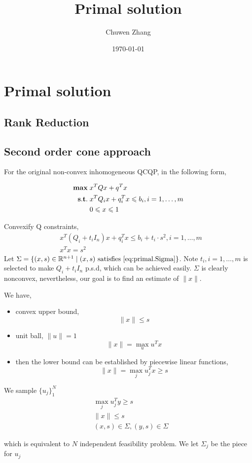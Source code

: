 \documentclass[../main]{subfiles}
\title{Primal solution}
\author{Chuwen Zhang}
\date{\today}
\begin{document}
\maketitle
{
    \setcounter{tocdepth}{3}
    \tableofcontents
}
\section{Primal solution}

\subsection{Rank Reduction}

\subsection{Second order cone approach}
For the original non-convex inhomogeneous QCQP, in the following form,

\begin{align}
    \mathbf{max}\; & x^T Q x+q^T x                                    \\
    \mathbf{s.t.}\; & x^T Q_i x+q_i^T x \leqslant b_{i}, i= 1,\dots, m \\
        & 0 \leqslant x \leqslant 1
\end{align}

Convexify Q constraints,
\begin{equation}\label{eq:primal.Sigma}
    \begin{aligned}
         & x^T(Q_i+t_i I_n) x+q_i^T x \leqslant b_i+ t_i \cdot s^2,i= 1,\dots, m \\
         & x^T x= s^2
    \end{aligned}
\end{equation}
Let \(\Sigma = \{(x,s)\in \mathbb R^{n+1}\mid (x,s) \textrm{ satisfies \eqref{eq:primal.Sigma}} \}\). Note \(t_i, i=1,\dots, m\) is selected to make \(Q_i+t_i I_n\) p.s.d, which can be achieved easily. \(\Sigma\) is clearly nonconvex, nevertheless, our goal is to find an estimate of \(\|x\|\).

We have,

\begin{itemize}
    \item convex upper bound,
          \begin{equation} \|x\| \le s \end{equation}
    \item unit ball, \(\|u\| = 1\)
          \begin{equation} \|x\| = \max_u u^T x \end{equation}
    \item then the lower bound can be established by piecewise linear functions,
          \begin{equation}
              \|x\| = \max_j u^T_j x \ge s
          \end{equation}
\end{itemize}

We sample \(\{u_j\}_1^N\)
\begin{align}
     & \max_j u^T_j y \ge s                 \\
     & \|x \| \le s                         \\
     & (x, s) \in \Sigma, (y, s) \in \Sigma
\end{align}

which is equivalent to \(N\) independent feasibility problem. We let \(\Sigma_j\) be the piece for \(u_j\)
\end{document}
